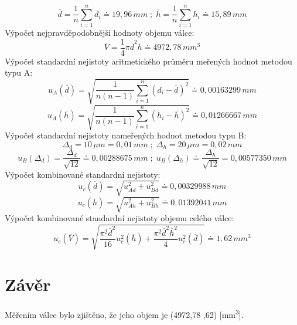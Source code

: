 \documentclass[11pt, a4paper]{report}
\begin{document}
\Large\[\overline{d} = \frac{1}{n}\sum_{i=1}^{n}d_i \doteq 19,96\,mm\;;\;\overline{h} = \frac{1}{n}\sum_{i=1}^{n}h_i \doteq 15,89\,mm\]
\normalsize
\newline Výpočet nejpravděpodobnější hodnoty objemu válce: \newline
\Large\[\overline{V} = \frac{1}{4}\pi\overline{d}^2\overline{h} \doteq 4 972,78\,mm^3\]
\normalsize
\newline Výpočet standardní nejistoty aritmetického průměru meřených hodnot metodou typu A:
\Large\[u_A(\overline{d})= \sqrt{\frac{1}{n(n-1)}\sum_{i=1}^{n}(d_i - \overline{d})^2} \doteq 0,00163299\,mm\]
\[u_A(\overline{h})= \sqrt{\frac{1}{n(n-1)}\sum_{i=1}^{n} (h_i - \overline{h})^2} \doteq 0,01266667\,mm\]
\normalsize
\newline
\noindent Výpočet standardní nejistoty nameřených hodnot metodou typu B:
\Large\[\Delta_d = 10\, \mu m = 0,01\,mm\;;\;\Delta_h = 20\, \mu m = 0,02\,mm\]
\[u_B(\Delta_d) = \frac{\Delta_d}{\sqrt{12}} \doteq 0,00288675\,mm\;;\;u_B(\Delta_h) \doteq \frac{\Delta_h}{\sqrt{12}} = 0,00577350\,mm\]
\newline
\normalsize Výpočet kombinované standardní nejistoty:
\Large\[u_c(\overline{d}) = \sqrt{u_{Ad}^2 + u_{Bd}^2}\doteq0,00329988\,mm\]
\[u_c(\overline{h}) = \sqrt{u_{Ah}^2 + u_{Bh}^2}\doteq  0,01392041\,mm\]
\normalsize
\newline
\noindent Výpočet kombinované standardní nejistoty objemu celého válce:
\Large\[u_c(\overline{V}) = \sqrt{\frac{\pi^2\overline{d}^2}{16}u_c^2(\overline{h})+ \frac{\pi^2\overline{d}^2\overline{h}^2}{4}u_c^2(\overline{d})} \doteq 1,62\,mm^3\]


\chapter{Závěr}
\normalsize Měřením válce bylo zjištěno, že jeho objem je (4972,78 \pm{},62) [mm\textsuperscript{3}].
\end{document}
